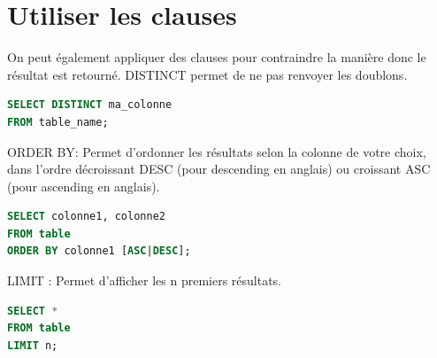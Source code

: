 \section{Utiliser les clauses}
On peut également appliquer des clauses pour contraindre la manière donc le résultat est retourné.
DISTINCT permet de ne pas renvoyer les doublons.
\begin{lstlisting}[style=SQLstyle, language=SQL]
SELECT DISTINCT ma_colonne
FROM table_name;
\end{lstlisting}

ORDER BY: Permet d’ordonner les résultats selon la colonne de votre choix, dans l'ordre décroissant DESC (pour descending en anglais) ou croissant ASC (pour ascending en anglais).

\begin{lstlisting}[style=SQLstyle, language=SQL]
SELECT colonne1, colonne2
FROM table
ORDER BY colonne1 [ASC|DESC];
\end{lstlisting}

LIMIT : Permet d'afficher les n premiers résultats.

\begin{lstlisting}[style=SQLstyle, language=SQL]
SELECT *
FROM table
LIMIT n;
\end{lstlisting}


